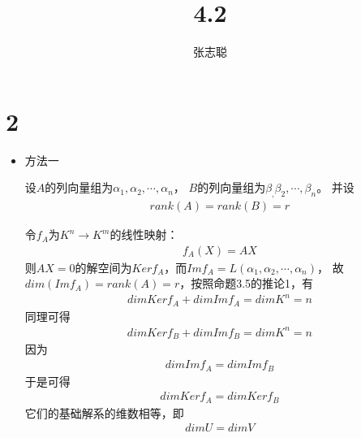 \documentclass{article}
\begin{document}
\title{4.2}
\author{张志聪}
\maketitle

\section*{2}

\begin{itemize}
  \item 方法一

        设$A$的列向量组为$\alpha_1, \alpha_2, \cdots, \alpha_n$，
        $B$的列向量组为$\beta_, \beta_2, \cdots, \beta_n$。
        并设
        \begin{align*}
          rank(A) = rank(B) = r
        \end{align*}

        令$f_A$为$K^n \to K^m$的线性映射：
        \begin{align*}
          f_A(X) = AX
        \end{align*}
        则$AX = 0$的解空间为$Kerf_A$，而$Imf_A = L(\alpha_1, \alpha_2, \cdots, \alpha_n)$，
        故$dim(Imf_A) = rank(A) = r$，按照命题3.5的推论1，有
        \begin{align*}
          dim Kerf_A + dim Imf_A = dim K^n = n
        \end{align*}
        同理可得
        \begin{align*}
          dim Kerf_B + dim Imf_B = dim K^n = n
        \end{align*}
        因为
        \begin{align*}
          dim Imf_A = dim Imf_B
        \end{align*}
        于是可得
        \begin{align*}
          dim Kerf_A = dim Kerf_B
        \end{align*}
        它们的基础解系的维数相等，即
        \begin{align*}
          dim U = dim V
        \end{align*}


\end{itemize}
\end{document}
